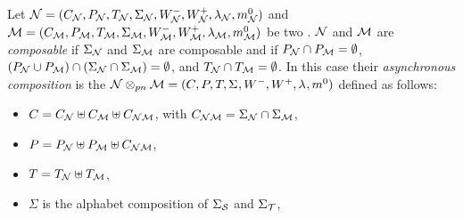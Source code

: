 \begin{definition}\label{def:aync-comp-aiopn}
Let $\pnN = \apntup{\pnN}$ and $\M = \apntup{\M}$ be two \AIOPNs.
$\pnN$ and $\M$ are \emph{composable} if $\Sigma_{\pnN}$ and  $\Sigma_{\M}$ are composable and if
$P_{\pnN} \cap P_{\M} = \emptyset$, $(P_{\pnN} \cup P_{\M}) \cap (\Sigma_\pnN \cap \Sigma_\M) = \emptyset$, and $T_{\pnN} \cap T_{\M} = \emptyset$. In this case their 
\emph{asynchronous composition}
is the \AIOPN $\pnN \compospn \M = \apntup{}$ defined as follows:
    \begin{itemize}
    \item $\chan = \chan_\pnN \uplus \chan_\M \uplus \chan_{\pnN\M}$, with $\chan_{\pnN\M} = \Sigma_\pnN \cap \Sigma_\M$,
    \item $P = P_{\pnN} \uplus P_{\M} \uplus \chan_{\pnN\M}$,

    \item $T = T_{\pnN} \uplus T_{\M}$,
    \item $\Sigma$ is the alphabet composition of $\Sigma_\S$ and $\Sigma_\T$,
    

\end{itemize}
\end{definition}
